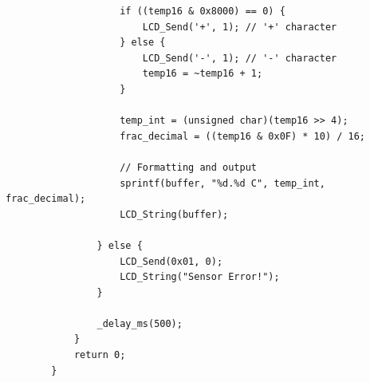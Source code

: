 \documentclass[14pt, a4paper]{extreport}
\begin{document}
\begin{verbatim}
					if ((temp16 & 0x8000) == 0) {
						LCD_Send('+', 1); // '+' character
					} else {
						LCD_Send('-', 1); // '-' character
						temp16 = ~temp16 + 1; 
					}
					
					temp_int = (unsigned char)(temp16 >> 4);
					frac_decimal = ((temp16 & 0x0F) * 10) / 16; 
					
					// Formatting and output
					sprintf(buffer, "%d.%d C", temp_int, frac_decimal);
					LCD_String(buffer);
					
				} else {
					LCD_Send(0x01, 0);
					LCD_String("Sensor Error!");
				}
				
				_delay_ms(500); 
			}
			return 0;
		}
	\end{verbatim}
\end{document}
